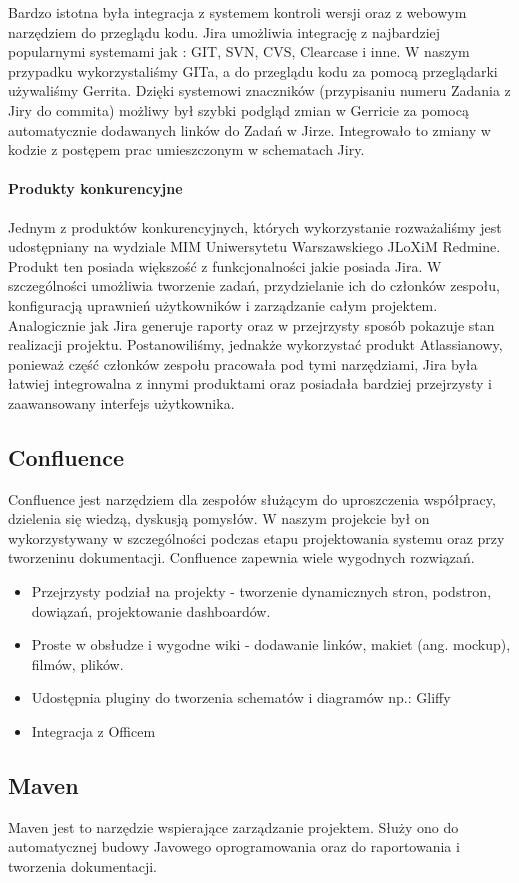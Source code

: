 \documentclass[licencjacka]{pracamgr}
\begin{document}
Bardzo istotna była integracja z systemem kontroli wersji oraz z webowym narzędziem do przeglądu kodu.
Jira umożliwia integrację z najbardziej popularnymi systemami jak : GIT, SVN, CVS, Clearcase i inne.
W naszym przypadku wykorzystaliśmy GITa, a do przeglądu kodu za pomocą przeglądarki używaliśmy Gerrita. 
Dzięki systemowi znaczników (przypisaniu numeru Zadania z Jiry do commita) możliwy był szybki podgląd zmian w Gerricie za pomocą automatycznie dodawanych linków do Zadań w Jirze.
Integrowało to zmiany w kodzie z postępem prac umieszczonym w schematach Jiry.  

\paragraph{Produkty konkurencyjne}
Jednym z produktów konkurencyjnych, których wykorzystanie rozważaliśmy jest udostępniany na wydziale MIM Uniwersytetu Warszawskiego JLoXiM Redmine.
Produkt ten posiada większość z funkcjonalności jakie posiada Jira. W szczególności umożliwia tworzenie zadań, przydzielanie ich do członków zespołu, 
konfiguracją uprawnień użytkowników i zarządzanie całym projektem. Analogicznie jak Jira generuje raporty oraz w przejrzysty sposób pokazuje stan 
realizacji projektu.
Postanowiliśmy, jednakże wykorzystać produkt Atlassianowy, ponieważ część członków zespołu pracowała pod tymi narzędziami, Jira była łatwiej integrowalna
 z innymi produktami oraz posiadała bardziej przejrzysty i zaawansowany interfejs użytkownika.
\subsection{Confluence}
Confluence jest narzędziem dla zespołów służącym do uproszczenia współpracy, dzielenia się wiedzą, dyskusją pomysłów.
W naszym projekcie był on wykorzystywany w szczególności podczas etapu projektowania systemu oraz przy tworzeninu dokumentacji.
Confluence zapewnia wiele wygodnych rozwiązań.
\begin{itemize}
\item Przejrzysty podział na projekty - tworzenie dynamicznych stron, podstron, dowiązań, projektowanie dashboardów.
\item Proste w obsłudze i wygodne wiki - dodawanie linków, makiet (ang. mockup), filmów, plików.
\item Udostępnia pluginy do tworzenia schematów i diagramów np.: Gliffy
\item Integracja z Officem  
\end{itemize}
\subsection{Maven}
Maven jest to narzędzie wspierające zarządzanie projektem. Służy ono do automatycznej budowy Javowego oprogramowania oraz do raportowania i tworzenia dokumentacji.
\end{document}
